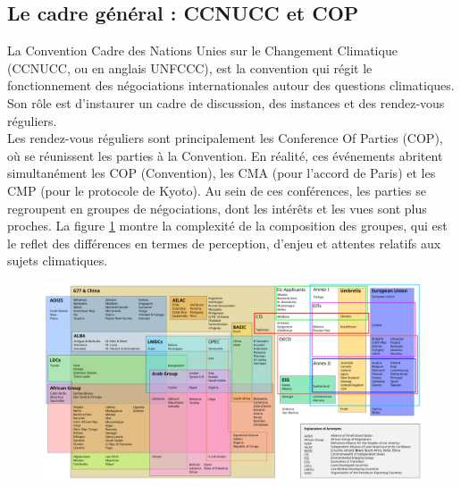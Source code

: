 \subsection{Le cadre général : CCNUCC et COP}
\label{sect:1.2.2}


La Convention Cadre des Nations Unies sur le Changement Climatique (CCNUCC, ou en anglais UNFCCC), est la convention qui régit le fonctionnement des négociations internationales autour des questions climatiques. Son rôle est d'instaurer un cadre de discussion, des instances et des rendez-vous réguliers. \\

Les rendez-vous réguliers sont principalement les Conference Of Parties (COP), où se réunissent les parties à la Convention. En réalité, ces événements abritent simultanément les COP (Convention), les CMA (pour l'accord de Paris) et les CMP (pour le protocole de Kyoto). Au sein de ces conférences, les parties se regroupent en groupes de négociations, dont les intérêts et les vues sont plus proches. La figure \ref{fig:COP} montre la complexité de la composition des groupes, qui est le reflet des différences en termes de perception, d'enjeu et attentes relatifs aux sujets climatiques. \\

\begin{figure}
    \centering
    \includegraphics[width=1\linewidth]{figures/UNFCCC_Party_Groupings.svg.png}
    \label{fig:COP}
\end{figure}

